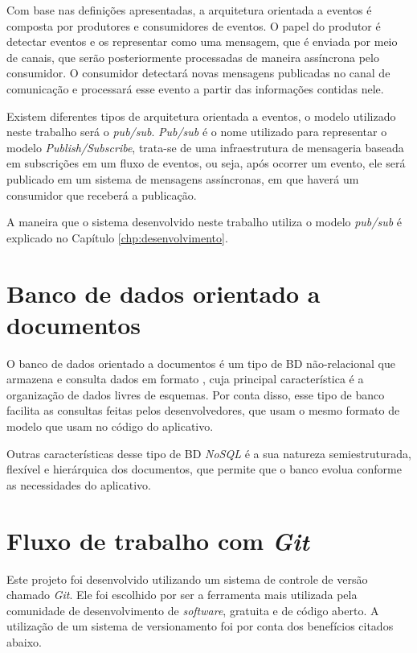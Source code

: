 Com base nas definições apresentadas, a arquitetura orientada a eventos é composta por produtores e consumidores de eventos. O papel do produtor é detectar eventos e os representar como uma mensagem, que é enviada por meio de canais, que serão posteriormente processadas de maneira assíncrona pelo consumidor. O consumidor detectará novas mensagens publicadas no canal de comunicação e processará esse evento a partir das informações contidas nele. 

Existem diferentes tipos de arquitetura orientada a eventos, o modelo utilizado neste trabalho será o \textit{pub/sub}. \textit{Pub/sub} é o nome utilizado para representar o modelo \textit{Publish/Subscribe}, trata-se de uma infraestrutura de mensageria baseada em subscrições em um fluxo de eventos, ou seja, após ocorrer um evento, ele será publicado em um sistema de mensagens assíncronas, em que haverá um consumidor que receberá a publicação.

A maneira que o sistema desenvolvido neste trabalho utiliza o modelo \textit{pub/sub} é explicado no Capítulo \ref{chp:desenvolvimento}.

\section{Banco de dados orientado a documentos}\label{sec:bd}
O banco de dados orientado a documentos é um tipo de BD não-relacional que armazena e consulta dados em formato , cuja principal característica é a organização de dados livres de esquemas. Por conta disso, esse tipo de banco facilita as consultas feitas pelos desenvolvedores, que usam o mesmo formato de modelo que usam no código do aplicativo.

Outras características desse tipo de BD \textit{NoSQL} é a sua natureza semiestruturada, flexível e hierárquica dos documentos, que permite que o banco evolua conforme as necessidades do aplicativo.

\section{Fluxo de trabalho com \textit{Git}}\label{sec:Git}
Este projeto foi desenvolvido utilizando um sistema de controle de versão chamado \textit{Git}. Ele foi escolhido por ser a ferramenta mais utilizada pela comunidade de desenvolvimento de \textit{software}, gratuita e de código aberto. A utilização de um sistema de versionamento foi por conta dos benefícios citados abaixo.

